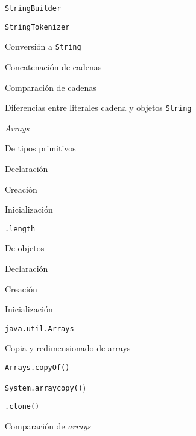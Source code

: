 \begin{longenum}
\begin{longenum}
\begin{longenum}
\begin{longenum}
\begin{longenum}
                    \item \texttt{StringBuilder}
                    \item \texttt{StringTokenizer}
                \end{longenum}
                \item Conversión a \texttt{String}
                \item Concatenación de cadenas
                \item Comparación de cadenas
                \item Diferencias entre literales cadena y objetos \texttt{String}
            \end{longenum}
            \item \textit{Arrays}
            \begin{longenum}
                \item De tipos primitivos
                \begin{longenum}
                    \item Declaración
                    \item Creación
                    \item Inicialización
                \end{longenum}
                \item \texttt{.length}
                \item De objetos
                \begin{longenum}
                    \item Declaración
                    \item Creación
                    \item Inicialización
                \end{longenum}
                \item \texttt{java.util.Arrays}
                \item Copia y redimensionado de arrays
                \begin{longenum}
                    \item \texttt{Arrays.copyOf()}
                    \item \texttt{System.arraycopy()})
                    \item \texttt{.clone()} 
                \end{longenum}
                \item Comparación de \textit{arrays}
                \begin{longenum}

\end{longenum}
\end{longenum}
\end{longenum}
\end{longenum}
\end{longenum}
